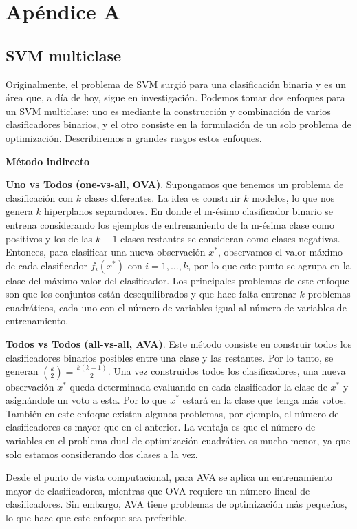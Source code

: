 \documentclass[letterpaper,12pt,oneside]{book}
\begin{document}
{{{{\chapter*{Apéndice A}
\section*{SVM multiclase}
Originalmente, el problema de SVM surgió para una clasificación binaria y es un área que, a día de hoy, sigue en investigación. Podemos tomar dos enfoques para un SVM multiclase: uno es mediante la construcción y combinación de varios clasificadores binarios, y el otro consiste en la formulación de un solo problema de optimización. Describiremos a grandes rasgos estos enfoques.

\textbf{Método indirecto}

\textbf{Uno vs Todos (one-vs-all, OVA)}. Supongamos que tenemos un problema de clasificación con \(k\) clases diferentes. La idea es construir \(k\) modelos, lo que nos genera \(k\) hiperplanos separadores. En donde el m-ésimo clasificador binario se entrena considerando los ejemplos de entrenamiento de la m-ésima clase como positivos y los de las \(k-1\) clases restantes se consideran como clases negativas. Entonces, para clasificar una nueva observación \(x^{*}\), observamos el valor máximo de cada clasificador \(f_i(x^{*})\) con \(i=1, \dots, k\), por lo que este punto se agrupa en la clase del máximo valor del clasificador. Los principales problemas de este enfoque son que los conjuntos están desequilibrados y que hace falta entrenar \(k\) problemas cuadráticos, cada uno con el número de variables igual al número de variables de entrenamiento.

\textbf{Todos vs Todos (all-vs-all, AVA)}. Este método consiste en construir todos los clasificadores binarios posibles entre una clase y las restantes. Por lo tanto, se generan \(\binom{k}{2}=\frac{k(k-1)}{2}\). Una vez construidos todos los clasificadores, una nueva observación \(x^{*}\) queda determinada evaluando en cada clasificador la clase de \(x^{*}\) y asignándole un voto a esta. Por lo que \(x^{*}\) estará en la clase que tenga más votos. También en este enfoque existen algunos problemas, por ejemplo, el número de clasificadores es mayor que en el anterior. La ventaja es que el número de variables en el problema dual de optimización cuadrática es mucho menor, ya que solo estamos considerando dos clases a la vez.

Desde el punto de vista computacional, para AVA se aplica un entrenamiento mayor de clasificadores, mientras que OVA requiere un número lineal de clasificadores. Sin embargo, AVA tiene problemas de optimización más pequeños, lo que hace que este enfoque sea preferible.


}}}}
\end{document}
